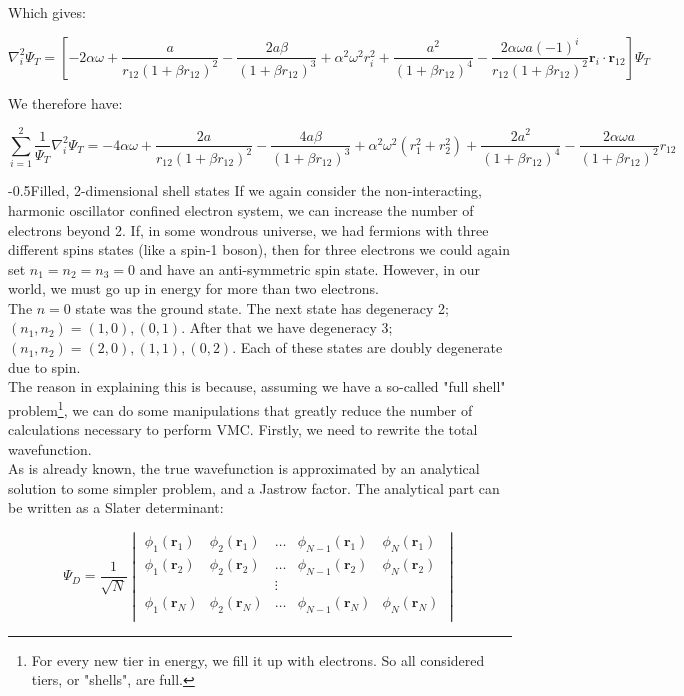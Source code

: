 \documentclass[english, a4paper]{article}
\makeatletter
\renewcommand{\subsubsection}{\@startsection{subsubsection}{3}{0pt}%
{-\baselineskip}{0.5\baselineskip}{\bf\large}}
\newcommand{\bm}[1]{\mathbf{#1}}
\makeatother
\begin{document}
Which gives:

\begin{equation}
	\nabla_i^2\Psi_T = \left[-2\alpha\omega + \frac{a}{r_{12}(1+\beta r_{12})^2} - \frac{2a\beta}{(1+\beta r_{12})^3} + \alpha^2\omega^2r_i^2 + \frac{a^2}{(1+\beta r_{12})^4} - \frac{2\alpha\omega a(-1)^i}{r_{12}(1+\beta r_{12})^2}\bm{r}_i\cdot\bm{r}_{12}\right] \Psi_T
\end{equation}

We therefore have:

\begin{equation}
	\sum_{i=1}^2\frac{1}{\Psi_T}\nabla_i^2\Psi_T = -4\alpha\omega + \frac{2a}{r_{12}(1+\beta r_{12})^2} - \frac{4a\beta}{(1+\beta r_{12})^3} + \alpha^2\omega^2(r_1^2 + r_2^2) + \frac{2a^2}{(1+\beta r_{12})^4} - \frac{2\alpha\omega a}{(1+\beta r_{12})^2}r_{12}
\end{equation}

\subsubsection{Filled, 2-dimensional shell states}
If we again consider the non-interacting, harmonic oscillator confined electron system, we can increase the number of electrons beyond 2. If, in some wondrous universe, we had fermions with three different spins states (like a spin-1 boson), then for three electrons we could again set $n_1=n_2=n_3 = 0$ and have an anti-symmetric spin state. However, in our world, we must go up in energy for more than two electrons.\\
The $n=0$ state was the ground state. The next state has degeneracy 2; $(n_1,n_2) = (1,0), (0,1)$. After that we have degeneracy 3;$(n_1,n_2) = (2,0), (1,1), (0,2)$. Each of these states are doubly degenerate due to spin.\\

The reason in explaining this is because, assuming we have a so-called "full shell" problem\footnote{For every new tier in energy, we fill it up with electrons. So all considered tiers, or "shells", are full.}, we can do some manipulations that greatly reduce the number of calculations necessary to perform VMC. Firstly, we need to rewrite the total wavefunction.\\
As is already known, the true wavefunction is approximated by an analytical solution to some simpler problem, and a Jastrow factor. The analytical part can be written as a Slater determinant:

\begin{equation}
	\Psi_{D} = \frac{1}{\sqrt{N}}
		\begin{vmatrix}
		\phi_1(\bm{r}_1) & \phi_2(\bm{r}_1) & \ldots & \phi_{N-1}(\bm{r}_1) & \phi_N(\bm{r}_1)\\
		\phi_1(\bm{r}_2) & \phi_2(\bm{r}_2) & \ldots & \phi_{N-1}(\bm{r}_2) & \phi_N(\bm{r}_2)\\
		& & \vdots & &\\
		\phi_1(\bm{r}_N) & \phi_2(\bm{r}_N) & \ldots & \phi_{N-1}(\bm{r}_N) & \phi_N(\bm{r}_N)\\
		\end{vmatrix}
\end{equation}
\end{document}
